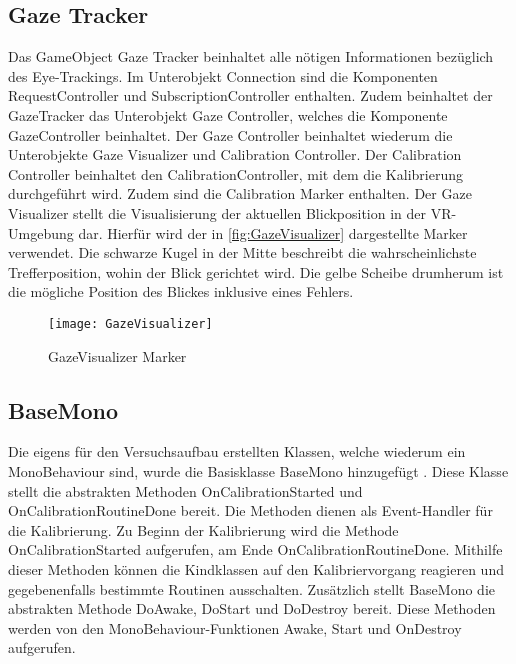 \subsection{Gaze Tracker}
Das GameObject \glqq Gaze Tracker\grqq{} beinhaltet alle nötigen Informationen bezüglich des Eye-Trackings. Im Unterobjekt Connection sind die Komponenten RequestController und SubscriptionController enthalten. Zudem beinhaltet der GazeTracker das Unterobjekt Gaze Controller, welches die Komponente GazeController beinhaltet. Der Gaze Controller beinhaltet wiederum die Unterobjekte Gaze Visualizer und Calibration Controller. Der Calibration Controller beinhaltet den CalibrationController, mit dem die Kalibrierung durchgeführt wird. Zudem sind die Calibration Marker enthalten. Der Gaze Visualizer stellt die Visualisierung der aktuellen Blickposition in der \ac{VR}-Umgebung dar. Hierfür wird der in \autoref{fig:GazeVisualizer} dargestellte Marker verwendet. Die schwarze Kugel in der Mitte beschreibt die wahrscheinlichste Trefferposition, wohin der Blick gerichtet wird. Die gelbe Scheibe drumherum ist die mögliche Position des Blickes inklusive eines Fehlers.

\begin{figure}[!htbp]
	\centering
	\texttt{[image: GazeVisualizer]}
	\caption[GazeVisualizer Marker]{GazeVisualizer Marker}
	\label{fig:GazeVisualizer}
\end{figure}

\subsection{BaseMono}
Die eigens für den Versuchsaufbau erstellten Klassen, welche wiederum ein MonoBehaviour sind, wurde die Basisklasse {\ttfamily BaseMono} hinzugefügt . Diese Klasse stellt die abstrakten Methoden {\ttfamily OnCalibrationStarted} und {\ttfamily OnCalibrationRoutineDone} bereit. Die Methoden dienen als Event-Handler für die Kalibrierung. Zu Beginn der Kalibrierung wird die Methode {\ttfamily OnCalibrationStarted} aufgerufen, am Ende {\ttfamily OnCalibrationRoutineDone}. Mithilfe dieser Methoden können die Kindklassen auf den Kalibriervorgang reagieren und gegebenenfalls bestimmte Routinen ausschalten. Zusätzlich stellt BaseMono die abstrakten Methode {\ttfamily DoAwake}, {\ttfamily DoStart} und {\ttfamily DoDestroy} bereit. Diese Methoden werden von den MonoBehaviour-Funktionen {\ttfamily Awake}, {\ttfamily Start} und {\ttfamily OnDestroy} aufgerufen.

